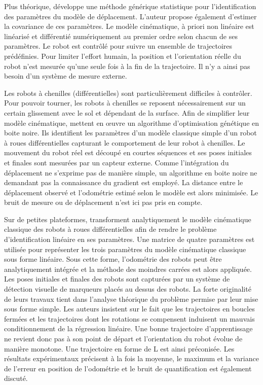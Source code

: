 Plus théorique, \cite{kelly_fast_2004} développe une méthode générique 
statistique pour l'identification des paramètres du modèle de déplacement.
L'auteur propose également d'estimer la covariance de ces paramètres.
Le modèle cinématique, à priori non linéaire est linéarisé et différentié 
numériquement au premier ordre selon chacun de ses paramètres.
Le robot est contrôlé pour suivre un ensemble de trajectoires prédéfinies. 
Pour limiter l'effort humain, la position et l'orientation réelle du
robot n'est mesurée qu'une seule fois à la fin de la trajectoire. 
Il n'y a ainsi pas besoin d'un système de mesure externe.

Les robots à chenilles (différentielles) sont particulièrement 
difficiles à contrôler. 
Pour pouvoir tourner, les robots à chenilles se reposent nécessairement 
sur un certain glissement avec le sol et dépendant de la surface.
Afin de simplifier leur modèle cinématique, \cite{martinez_approximating_2005}
mettent en œuvre un algorithme d'optimisation génétique en boite noire.
Ils identifient les paramètres d'un modèle classique simple d'un robot à roues 
différentielles capturant le comportement de leur robot à chenilles.
Le mouvement du robot réel est découpé en courtes séquences et 
ses poses initiales et finales sont mesurées par un capteur externe.
Comme l'intégration du déplacement ne s'exprime pas de manière simple, 
un algorithme en boite noire ne demandant pas la connaissance du gradient
est employé.
La distance entre le déplacement observé et l'odométrie estimé 
selon le modèle est alors minimisée.
Le bruit de mesure ou de déplacement n'est ici pas pris en compte.

Sur de petites plateformes, \cite{antonelli_calibration_2005}
transforment analytiquement le modèle cinématique classique des robots 
à roues différentielles afin de rendre le problème d'identification linéaire
en ses paramètres.
Une matrice de quatre paramètres est utilisée pour représenter
les trois paramètres du modèle cinématique classique sous forme linéaire.
Sous cette forme, l'odométrie des robots peut être analytiquement intégrée 
et la méthode des moindres carrées est alors appliquée.
Les poses initiales et finales des robots sont capturées par un système 
de détection visuelle de marqueurs placés au dessus des robots.
La forte originalité de leurs travaux tient dans l'analyse théorique 
du problème permise par leur mise sous forme simple.
Les auteurs insistent sur le fait que les trajectoires en boucles fermées et
les trajectoires dont les rotations se compensent induisent un mauvais 
conditionnement de la régression linéaire.
Une bonne trajectoire d'apprentissage ne revient donc pas à son point 
de départ et l'orientation du robot évolue de manière monotone.
Une trajectoire en forme de \og L \fg est ainsi préconisée.
Les résultats expérimentaux précisent à la fois la moyenne, le maximum 
et la variance de l'erreur en position de l'odométrie et le bruit 
de quantification est également discuté.

